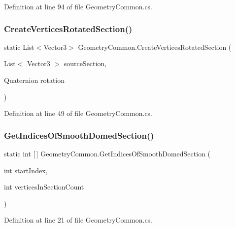 Definition at line 94 of file Geometry\+Common.\+cs.

\mbox{\label{class_geometry_common_af2330eeb38210494e38fd37e4cba2809}} 
\subsubsection{\texorpdfstring{CreateVerticesRotatedSection()}{CreateVerticesRotatedSection()}}
{\footnotesize\ttfamily static List$<$Vector3$>$ Geometry\+Common.\+Create\+Vertices\+Rotated\+Section (\begin{DoxyParamCaption}\item[{List$<$ Vector3 $>$}]{source\+Section,  }\item[{Quaternion}]{rotation }\end{DoxyParamCaption})\hspace{0.3cm}{\ttfamily [static]}}



Definition at line 49 of file Geometry\+Common.\+cs.

\mbox{\label{class_geometry_common_a1f4f9acf5a00f335f85282261a31fd3c}} 
\subsubsection{\texorpdfstring{GetIndicesOfSmoothDomedSection()}{GetIndicesOfSmoothDomedSection()}}
{\footnotesize\ttfamily static int \mbox{[}$\,$\mbox{]} Geometry\+Common.\+Get\+Indices\+Of\+Smooth\+Domed\+Section (\begin{DoxyParamCaption}\item[{int}]{start\+Index,  }\item[{int}]{vertices\+In\+Section\+Count }\end{DoxyParamCaption})\hspace{0.3cm}{\ttfamily [static]}}



Definition at line 21 of file Geometry\+Common.\+cs.

\mbox{\label{class_geometry_common_a9dab84938cd8a24192b3552022819daa}} 
